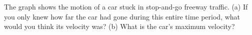 The graph shows the motion of a car stuck in stop-and-go
freeway traffic.  (a) If you only knew how far the car had
gone during this entire time period, what would you think
its velocity was?  (b) What is the car's maximum velocity? \answercheck
